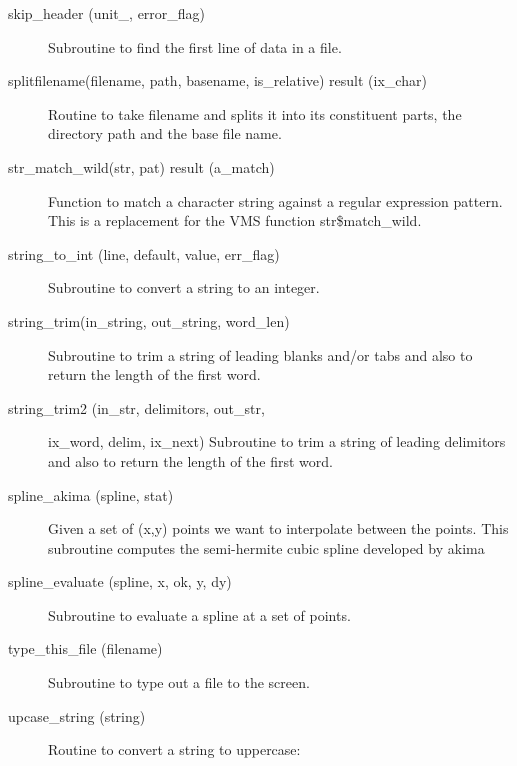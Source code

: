 \begin{description}
\item[skip_header (unit_, error_flag)] \Newline 
Subroutine to find the first line of data in a file. 

\item[splitfilename(filename, path, basename, is_relative) result (ix_char)] \Newline 
Routine to take filename and splits it into its constituent parts, 
the directory path and the base file name.  

\item[str_match_wild(str, pat) result (a_match)] \Newline 
Function to match a character string against a regular expression pattern.
This is a replacement for the VMS function str\$match_wild.

\item[string_to_int (line, default, value, err_flag)] \Newline 
Subroutine to convert a string to an integer.

\item[string_trim(in_string, out_string, word_len)] \Newline 
Subroutine to trim a string of leading blanks and/or tabs and also to return the
length of the first word.

\item[string_trim2 (in_str, delimitors, out_str,] \Newline 
                                     ix_word, delim, ix_next)
Subroutine to trim a string of leading delimitors and also to return the
length of the first word.

\item[spline_akima (spline, stat)] \Newline 
Given a set of (x,y) points we want to interpolate between the points.
This subroutine computes the semi-hermite cubic spline developed by akima

\item[spline_evaluate (spline, x, ok, y, dy)] \Newline 
Subroutine to evaluate a spline at a set of points.

\item[type_this_file (filename)] \Newline 
Subroutine to type out a file to the screen.

\item[upcase_string (string)] \Newline 
Routine to convert a string to uppercase:

\end{description}

